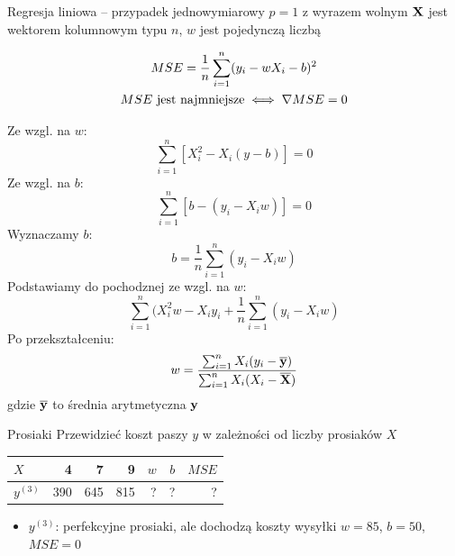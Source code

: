 \documentclass{sa}
\renewcommand{\vec}[1]{\ensuremath\mathbf{#1}}
\newcommand{\grad}{\ensuremath\nabla}
\let\avg\overline
\begin{document}
\begin{frame}{Regresja liniowa -- przypadek jednowymiarowy $p=1$ z wyrazem wolnym}
$\vec{X}$ jest wektorem kolumnowym typu $n$, $w$ jest pojedynczą liczbą

\begin{gather*}
MSE=\frac{1}{n}\sum_{i=1}^n (y_i-wX_i-b)^2  \\
MSE \text{ jest najmniejsze} \iff \grad MSE = 0
\end{gather*}

{
Ze wzgl. na $w$: \[\sum_{i=1}^n \left[X_i^2-X_i(y-b)\right] = 0\]
Ze wzgl. na $b$: \[\sum_{i=1}^n \left[b-(y_i-X_iw)\right] = 0\]
Wyznaczamy $b$:
\[b=\frac{1}{n}\sum_{i=1}^n (y_i-X_iw) \]
Podstawiamy do pochodznej ze wzgl. na $w$:
\[\sum_{i=1}^n(X_i^2w-X_iy_i+\frac{1}{n}\sum_{i=1}^n (y_i-X_iw) \]
}
{
Po przekształceniu:
\[w=\frac{\sum_{i=1}^n X_i(y_i-\avg{\vec{y}})}{\sum_{i=1}^n X_i(X_i-\avg{\vec{X}})} \]
gdzie $\avg{\vec{y}}$ to średnia arytmetyczna $\vec{y}$
}
\end{frame}

\begin{frame}{Prosiaki}
Przewidzieć \alert{koszt paszy $y$} w zależności od \alert{liczby prosiaków $X$}

\begin{center}
\begin{tabular}{l|rrr|rrr}
$X$ & 4 & 7 & 9 & $w$ & $b$ & $MSE$ \\
\hline
$y^{(3)}$ & 390 & 645 & 815 & \alert{?} & \alert{?} & \alert{?} \\
\end{tabular}
\end{center}

{
\begin{itemize}
\item $y^{(3)}$: perfekcyjne prosiaki, ale dochodzą koszty wysyłki $w=85$, $b=50$, $MSE=0$
\end{itemize}
}
\end{frame}
\end{document}
